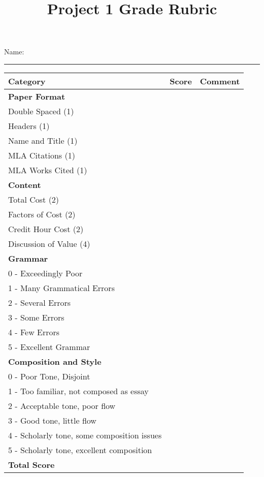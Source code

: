 \documentclass{article}
\title{Project 1 Grade Rubric}
\author{}
\date{}
\begin{document}
    \maketitle

    Name: \rule{5in}{0.25pt}
    \newline
    \newline
    \begin{tabular}{|l|l|l|}
        \hline
        \textbf{Category} & \textbf{Score} & \textbf{Comment} \\
        \hline
        \rule{0in}{0.25in}\textbf{Paper Format} & \hspace{0.25in} & \hspace{3in} \\
        \hline
        Double Spaced (1) & & \\
        Headers (1) & & \\
        Name and Title (1) & & \\
        MLA Citations (1) & & \\
        MLA Works Cited (1) & & \\
        \hline
        \textbf{Content} & & \\
        Total Cost (2) & & \\
        Factors of Cost (2) & & \\
        Credit Hour Cost (2) & & \\
        Discussion of Value (4) & & \\
        \hline
        \textbf{Grammar} & & \\
        0 - Exceedingly Poor & & \\
        1 - Many Grammatical Errors & & \\
        2 - Several Errors & & \\
        3 - Some Errors & & \\
        4 - Few Errors & & \\
        5 - Excellent Grammar & & \\
        \hline
        \textbf{Composition and Style} & & \\
        0 - Poor Tone, Disjoint & & \\
        1 - Too familiar, not composed as essay & & \\
        2 - Acceptable tone, poor flow & & \\
        3 - Good tone, little flow & & \\
        4 - Scholarly tone, some composition issues & & \\
        5 - Scholarly tone, excellent composition & & \\
        \hline
        \rule{0in}{0.25in}\textbf{Total Score} & & \\
        \hline
    \end{tabular}
\end{document}
